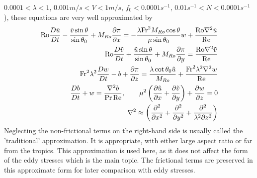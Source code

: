 $0.0001<\lambda<1$, $0.001m/s <V<1 m/s$, $f_0<0.0001 s^{-1}$, $0.01
s^{-1}<N<0.0001 s^{-1}$), these equations are very well approximated
by
\begin{eqnarray}
\Ro{\Dt\tu}- \frac{\tv \sin\theta}{\sin\theta_0}+\Mr\pd{x}{\pi}=-\frac{\lambda\Fr^2\Mr\cos \theta}{\mu\sin\theta_0} w+\frac{\Ro\nabla^2{\tu}}{\Re}\nonumber\\
\Ro\Dt\tv+ \frac{\tu\sin\theta}{\sin\theta_0}+\Mr\pd{y}{\pi}=\frac{\Ro\nabla^2{\tv}}{\Re}\nonumber\\
\Fr^2\lambda^2\Dt w -b+\pd{z}{\pi}=\frac{\lambda\cot \theta_0 \tu}{\Mr}\nonumber+\frac{\Fr^2\lambda^2\nabla^2w}{\Re}\\
\Dt b+w=\frac{\nabla^2 b}{\Pr\Re}\nonumber, \qquad
\mu^2\left(\pd x\tu  + \pd y\tv \right)+\pd z w =0\nonumber\\
\nabla^2\approx\left(\frac{\partial^2}{\partial x^2}+\frac{\partial^2}{\partial y^2}+\frac{\partial^2}{\lambda^2\partial z^2}\right)\nonumber
\end{eqnarray}
Neglecting the non-frictional terms on the right-hand side is usually
called the 'traditional' approximation.  It is appropriate, with
either large aspect ratio or far from the tropics.  This approximation
is used here, as it does not affect the form of the eddy stresses
which is the main topic.  The frictional terms are preserved in this
approximate form for later comparison with eddy stresses.

%





